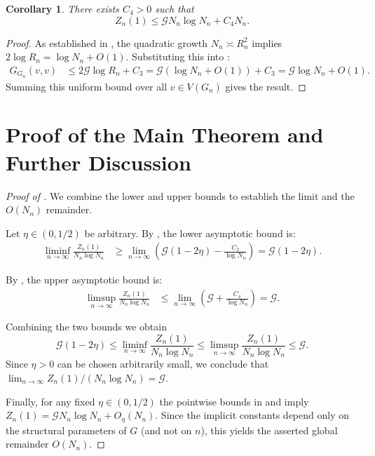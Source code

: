 \documentclass{article}
\numberwithin{equation}{section}
\newtheorem{corollary}[theorem]{Corollary}
\theoremstyle{definition}
\theoremstyle{remark}
\newcommand{\cG}{\mathcal{G}}
\begin{document}
\begin{corollary}\label{cor:upper}
There exists $C_4 > 0$ such that
\[
Z_n(1) \leq \cG N_n \log N_n + C_4 N_n.
\]
\end{corollary}

\begin{proof}
As established in , the quadratic growth $N_n \asymp R_n^2$ implies $2\log R_n = \log N_n + O(1)$. Substituting this into :
\begin{align*}
G_{G_n}(v,v) &\leq 2\cG \log R_n + C_3 = \cG (\log N_n + O(1)) + C_3 = \cG \log N_n + O(1).
\end{align*}
Summing this uniform bound over all $v \in V(G_n)$ gives the result.
\end{proof}

\section{Proof of the Main Theorem and Further Discussion}\label{sec:discussion}

\begin{proof}[Proof of ]
We combine the lower and upper bounds to establish the limit and the $O(N_n)$ remainder.


Let $\eta \in (0,1/2)$ be arbitrary. By , the lower asymptotic bound is:
\begin{align*}
\liminf_{n \to \infty} \frac{Z_n(1)}{N_n \log N_n} &\geq \lim_{n \to \infty} \left( \cG(1-2\eta) - \frac{C_2}{\log N_n} \right) = \cG(1-2\eta).
\end{align*}

By , the upper asymptotic bound is:
\begin{align*}
\limsup_{n \to \infty} \frac{Z_n(1)}{N_n \log N_n} &\leq \lim_{n \to \infty} \left( \cG + \frac{C_4}{\log N_n} \right) = \cG.
\end{align*}

Combining the two bounds we obtain
\[
\cG(1-2\eta) \leq \liminf_{n \to \infty} \frac{Z_n(1)}{N_n \log N_n} \leq \limsup_{n \to \infty} \frac{Z_n(1)}{N_n \log N_n} \leq \cG.
\]
Since $\eta > 0$ can be chosen arbitrarily small, we conclude that $\lim_{n \to \infty} Z_n(1) / (N_n \log N_n) = \cG$.

\smallskip
\noindent Finally, for any fixed $\eta\in(0,1/2)$ the pointwise bounds in  and  imply
$Z_n(1)=\cG N_n \log N_n + O_{\eta}(N_n)$. Since the implicit constants depend only on the structural parameters of $G$ (and not on $n$), this yields the asserted global remainder $O(N_n)$.
\end{proof}
\end{document}
